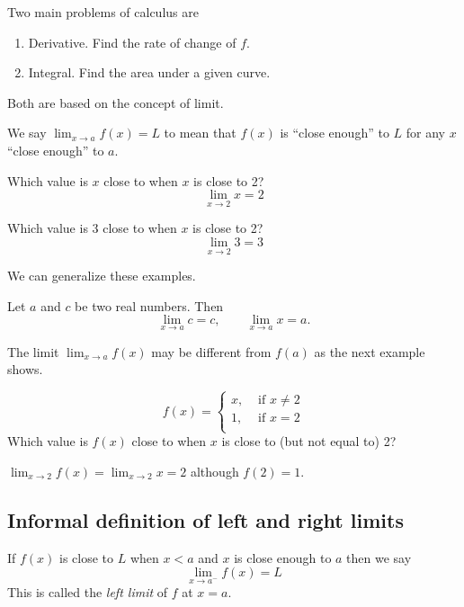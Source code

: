 \documentclass[calc1-main.tex]{subfiles}
\begin{document}
  Two main problems of calculus are
  \begin{enumerate}
    \item Derivative. Find the rate of change of $f$.
    \item Integral. Find the area under a given curve.
  \end{enumerate}
  Both are based on the concept of limit.

  We say $\lim_{x \to a} f(x) = L$ to mean that $f(x)$ is ``close enough'' to $L$ for any $x$ ``close enough'' to $a$.

  \begin{example}
    Which value is $x$ close to when $x$ is close to 2?
    \[
      \lim_{x \to 2} x = 2
    \]
  \end{example}

  \begin{example}
    Which value is 3 close to when $x$ is close to 2?
    \[
      \lim_{x \to 2} 3 = 3
    \]
  \end{example}

  We can generalize these examples.
  \begin{theorem}
    \label{basic limit theorems}
    Let $a$ and $c$ be two real numbers. Then
    \[
      \lim_{x \to a} c = c, \qquad
      \lim_{x \to a} x = a.
    \]
  \end{theorem}


  The limit $\lim_{x \to a} f(x)$ may be different from $f(a)$ as the next example shows.
  \begin{example}
    \[
      f(x) =
      \begin{cases}
        x, &\text{ if } x\neq 2\\
        1, &\text{ if } x = 2\\
      \end{cases}
    \]
    Which value is $f(x)$ close to when $x$ is close to (but not equal to) 2?

    $\lim_{x \to 2} f(x) = \lim_{x \to 2} x = 2$ although $f(2) = 1$.
  \end{example}

  \subsection*{Informal definition of left and right limits}
  If $f(x)$ is close to $L$ when $x<a$ and $x$ is close enough to $a$ then we say
  \[
    \lim_{x \to a^{-}} f(x) = L
  \]
  This is called the \emph{left limit} of $f$ at $x=a$.
\end{document}
